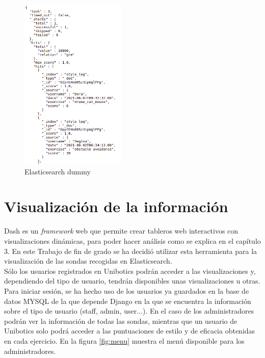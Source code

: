 \begin{figure}[H]
    \centering
    \includegraphics[width=5cm, keepaspectratio]{img/dummy.png}
    \caption{Elasticsearch dummy}
    \label{fig:dummy}
\end{figure}

\section{Visualización de la información}

Dash es un \textit{framework} web que permite crear tableros web interactivos con visualizaciones dinámicas, para poder hacer análisis como se explica en el capítulo 3. En este Trabajo de fin de grado se ha decidió utilizar esta herramienta para la visualización de las sondas recogidas en Elasticsearch.\\

Sólo los usuarios registrados en Unibotics podrán acceder a las visualizaciones y, dependiendo del tipo de usuario, tendrán disponibles unas visualizaciones u otras. Para iniciar sesión, se ha hecho uso de los usuarios ya guardados en la base de datos MYSQL de la que depende Django en la que se encuentra la información sobre el tipo de usuario (staff, admin, user...). En el caso de los administradores podrán ver la información de todas las sondas, mientras que un usuario de Unibotics solo podrá acceder a las puntuaciones de estilo y de eficacia obtenidas en cada ejercicio. En la figura \ref{fig:menu} muestra el menú disponible para los administradores.

